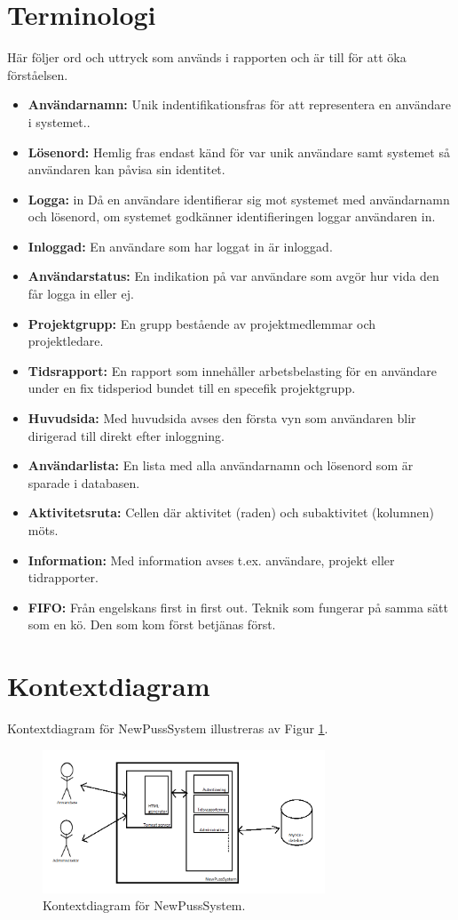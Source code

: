 \documentclass[a4paper]{article}
\begin{document}
\section{Terminologi}
\label{terminologi}
Här följer ord och uttryck som används i rapporten och är till för att öka förståelsen.
\begin{itemize}
\item []\textbf{Användarnamn:} Unik indentifikationsfras för att representera en användare i systemet..
\item []\textbf{Lösenord:} Hemlig fras endast känd för var unik användare samt systemet så användaren kan påvisa sin identitet.
\item []\textbf{Logga:} in Då en användare identifierar sig mot systemet med användarnamn och lösenord, om systemet godkänner identifieringen loggar användaren in.
\item []\textbf{Inloggad:} En användare som har loggat in är inloggad.
\item []\textbf{Användarstatus:} En indikation på var användare som avgör hur vida den får logga in eller ej.
\item []\textbf{Projektgrupp:} En grupp bestående av projektmedlemmar och projektledare.
\item []\textbf{Tidsrapport:} En rapport som innehåller arbetsbelasting för en användare under en fix tidsperiod bundet till en specefik projektgrupp.
\item []\textbf{Huvudsida:} Med huvudsida avses den första vyn som användaren blir dirigerad till direkt efter inloggning. 
\item []\textbf{Användarlista:} En lista med alla användarnamn och lösenord som är sparade i databasen.
\item []\textbf{Aktivitetsruta:} Cellen där aktivitet (raden) och subaktivitet (kolumnen) möts.
\item []\textbf{Information:} Med information avses t.ex. användare, projekt eller tidrapporter.
\item []\textbf{FIFO:} Från engelskans first in first out. Teknik som fungerar på samma sätt som en kö. Den som kom först betjänas först.

\end{itemize}
\section{Kontextdiagram}
Kontextdiagram för NewPussSystem illustreras av Figur \ref{image_kontext}.

\begin{figure}[h!]
  \centering
    \includegraphics[width=0.75\textwidth]{context}
   \caption{Kontextdiagram för NewPussSystem.}
   \label{image_kontext}
\end{figure}
\end{document}
